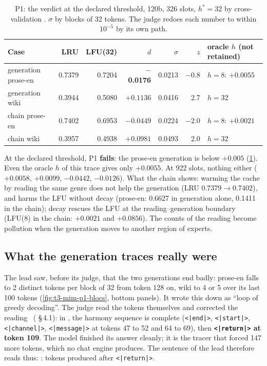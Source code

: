 \begin{table}[tbp]
\centering\small
\caption[P1: the verdict at the declared threshold]{P1: the verdict at the declared threshold, 120b, 326 slots, $h^\ast = 32$ by cross-validation \mes. $\sigma$ by blocks of 32 tokens. The judge redoes each number to within $10^{-5}$ by its own path.}
\label{t3mim:tab:p1}
\begin{tabular}{@{}lrrrrrl@{}}
\toprule
Case & LRU & LFU(32) & $d$ & $\sigma$ & $z$ & oracle $h$ (not retained) \\
\midrule
generation prose-en & 0.7379 & 0.7204 & \textbf{$-$0.0176} & 0.0213 & $-0.8$ & $h = 8$: $+0.0055$ \\
generation wiki & 0.3944 & 0.5080 & $+0.1136$ & 0.0416 & 2.7 & $h = 32$ \\
chain prose-en & 0.7402 & 0.6953 & $-0.0449$ & 0.0224 & $-2.0$ & $h = 8$: $+0.0021$ \\
chain wiki & 0.3957 & 0.4938 & $+0.0981$ & 0.0493 & 2.0 & $h = 32$ \\
\bottomrule
\end{tabular}
\end{table}

At the declared threshold, P1 \textbf{fails}: the prose-en generation is below $+0.005$ (\cref{t3mim:tab:p1}). Even the oracle $h$ of this trace gives only $+0.0055$. At 922 slots, nothing either ($+0.0058$, $+0.0099$, $-0.0442$, $-0.0126$). What the chain shows: warming the cache by reading the same genre does not help the generation (LRU $0.7379 \to 0.7402$), and harms the LFU without decay (prose-en: 0.6627 in generation alone, 0.1411 in the chain); decay rescues the LFU at the reading--generation boundary (LFU(8) in the chain: $+0.0021$ and $+0.0856$). The counts of the reading become pollution when the generation moves to another region of experts.

\subsection{What the generation traces really were}\label{t3mim:sec:p1-traces}

The lead saw, before its judge, that the two generations end badly: prose-en falls to 2 distinct tokens per block of 32 from token 128 on, wiki to 4 or 5 over its last 100 tokens (\cref{fig:t3-mim-p1-blocs}, bottom panels). It wrote this down as ``loop of greedy decoding''. The judge read the tokens themselves and corrected the reading \mes~( §\,4.1): in , the harmony sequence is complete (\texttt{<|end|>}, \texttt{<|start|>}, \texttt{<|channel|>}, \texttt{<|message|>} at tokens 47 to 52 and 64 to 69), then \textbf{\texttt{<|return|>} at token 109}. The model finished its answer cleanly; it is the tracer that forced 147 more tokens, which no chat engine produces. The sentence of the lead therefore reads thus: : tokens produced after \texttt{<|return|>}.

